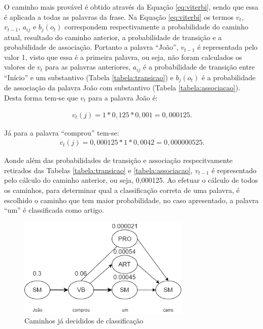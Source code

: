 O caminho mais provável é obtido através da Equação \ref{eq:viterbi}, sendo que
essa é aplicada a todas as palavras da frase. Na Equação \ref{eq:viterbi} os
termos $v_t$, $v_{t-1}$, $a_{ij}$ e $b_j(o_t)$ correspondem respectivamente a
probabilidade do caminho atual, resultado do caminho anterior, a probabilidade
de transição e a probabilidade de associação.
Portanto a palavra ``João'', $v_{t-1}$ é representada pelo valor 1, visto
que essa é a primeira palavra, ou seja, não foram calculados os valores de
$v_t$ para as palavras anteriores, $a_{ij}$ é a probabilidade de transição entre
``Início'' e um substantivo (Tabela \ref{tabela:transicao}) e $b_j(o_t)$ é a
probabilidade de associação da palavra João com substantivo (Tabela
\ref{tabela:associacao}). Desta forma tem-se que $v_t$ para a palavra João é:

\begin{equation}
\begin{split}
v_t(j) = 1 * 0,125 * 0,001 = 0,000125.
\end{split}
\label{eq:joao}
\end{equation}

Já para a palavra ``comprou'' tem-se:
\begin{equation}
\begin{split}
v_t(j) = 0,000125 * 1 * 0,0042 = 0,000000525.
\end{split}
\label{eq:comprou}
\end{equation}

Aonde além das probabilidades de transição e associação respecitvamente
retirados das Tabelas \ref{tabela:transicao} e \ref{tabela:associacao}, $v_{t-1}$ é representado pelo cálculo do
caminho anterior, ou seja, 0,000125. Ao efetuar o cálculo de todos os caminhos,
para determinar qual a classificação correta de uma palavra, é escolhido o caminho que tem maior probabilidade, no
caso apresentado, a palavra ``um'' é classificada como artigo.

\begin{figure}[htbp]
\centering
\includegraphics[height=180px]{imagens/markov2.png}
\caption{Caminhos já decididos de classificação}
\label{fig:markov2}
\end{figure}

